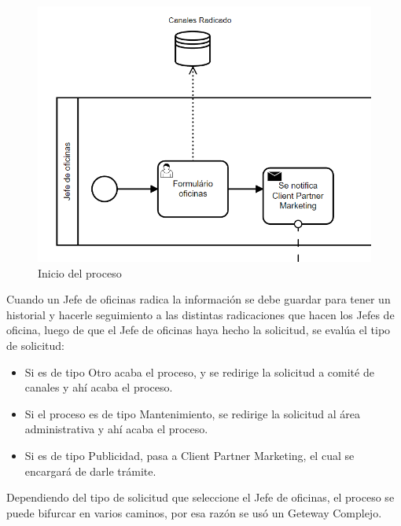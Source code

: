 \begin{figure}[H]
	\centering
	\includegraphics[scale=0.5]{Capitulo4/imagenes/1.png}
	\caption{Inicio del proceso}
	\label{inipro}
\end{figure}

Cuando un Jefe de oficinas radica la información se debe guardar para tener un historial y hacerle seguimiento a las distintas radicaciones que hacen los Jefes de oficina, luego de que el Jefe de oficinas haya hecho la solicitud, se evalúa el tipo de solicitud:
\begin{itemize}
	\item Si es de tipo Otro acaba el proceso, y se redirige la solicitud a comité de canales y ahí acaba el proceso.
	\item Si el proceso es de tipo Mantenimiento, se redirige la solicitud al área administrativa y ahí acaba el proceso.
	\item Si es de tipo Publicidad, pasa a Client Partner Marketing, el cual se encargará de darle trámite.
\end{itemize}

Dependiendo del tipo de solicitud que seleccione el Jefe de oficinas, el proceso se puede bifurcar en varios caminos, por esa razón se usó un Geteway Complejo. 

